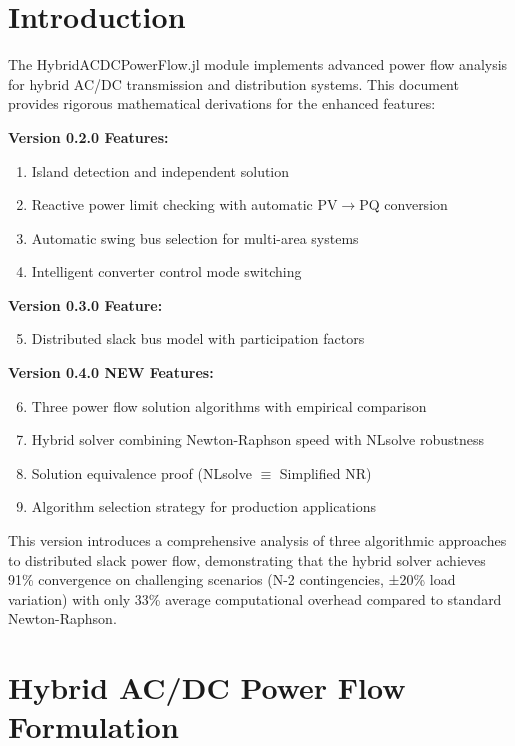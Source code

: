 \documentclass[11pt]{article}
\begin{document}
\section{Introduction}

The HybridACDCPowerFlow.jl module implements advanced power flow analysis for hybrid AC/DC transmission and distribution systems. This document provides rigorous mathematical derivations for the enhanced features:

\textbf{Version 0.2.0 Features:}
\begin{enumerate}
    \item Island detection and independent solution
    \item Reactive power limit checking with automatic PV$\to$PQ conversion
    \item Automatic swing bus selection for multi-area systems
    \item Intelligent converter control mode switching
\end{enumerate}

\textbf{Version 0.3.0 Feature:}
\begin{enumerate}
    \setcounter{enumi}{4}
    \item Distributed slack bus model with participation factors
\end{enumerate}

\textbf{Version 0.4.0 NEW Features:}
\begin{enumerate}
    \setcounter{enumi}{5}
    \item Three power flow solution algorithms with empirical comparison
    \item Hybrid solver combining Newton-Raphson speed with NLsolve robustness
    \item Solution equivalence proof (NLsolve $\equiv$ Simplified NR)
    \item Algorithm selection strategy for production applications
\end{enumerate}

This version introduces a comprehensive analysis of three algorithmic approaches to distributed slack power flow, demonstrating that the hybrid solver achieves 91\% convergence on challenging scenarios (N-2 contingencies, ±20\% load variation) with only 33\% average computational overhead compared to standard Newton-Raphson.

\section{Hybrid AC/DC Power Flow Formulation}
\end{document}
